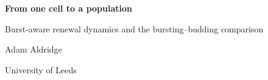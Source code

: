 \documentclass[11pt]{report}
\begin{document}
\hypersetup{pageanchor=false}
\begin{titlepage}
\centering
\vspace*{4cm}
{\LARGE\bfseries From one cell to a population\par}
\vspace{6pt}
{\large Burst-aware renewal dynamics and the bursting--budding comparison\par}
\vspace{2.5cm}
{\large Adam Aldridge\par}
\vspace{4pt}
{University of Leeds\par}
\end{titlepage}
\hypersetup{pageanchor=true}

\begingroup
\setlength{\parskip}{0pt}
\tableofcontents
\endgroup
\clearpage



\FloatBarrier
\begingroup
\footnotesize


\endgroup
\end{document}
